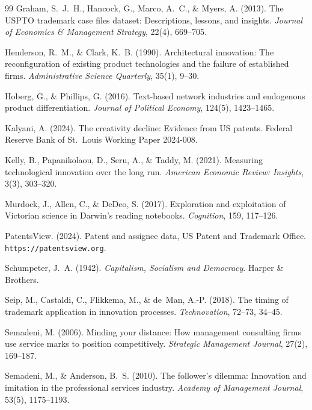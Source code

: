 \documentclass[11pt]{article}
\begin{document}
\begin{thebibliography}{99}
Graham, S.~J.~H., Hancock, G., Marco, A.~C., \& Myers, A. (2013). The USPTO
trademark case files dataset: Descriptions, lessons, and insights.
\emph{Journal of Economics \& Management Strategy}, 22(4), 669--705.

Henderson, R.~M., \& Clark, K.~B. (1990). Architectural innovation: The
reconfiguration of existing product technologies and the failure of
established firms. \emph{Administrative Science Quarterly}, 35(1), 9--30.

Hoberg, G., \& Phillips, G. (2016). Text-based network industries and
endogenous product differentiation. \emph{Journal of Political Economy},
124(5), 1423--1465.

Kalyani, A. (2024). The creativity decline: Evidence from US patents.
Federal Reserve Bank of St.\ Louis Working Paper 2024-008.

Kelly, B., Papanikolaou, D., Seru, A., \& Taddy, M. (2021). Measuring
technological innovation over the long run. \emph{American Economic
Review: Insights}, 3(3), 303--320.

Murdock, J., Allen, C., \& DeDeo, S. (2017). Exploration and exploitation
of Victorian science in Darwin's reading notebooks. \emph{Cognition},
159, 117--126.

PatentsView. (2024). Patent and assignee data, US Patent and Trademark
Office. \texttt{https://patentsview.org}.

Schumpeter, J.~A. (1942). \emph{Capitalism, Socialism and Democracy}.
Harper \& Brothers.

Seip, M., Castaldi, C., Flikkema, M., \& de~Man, A.-P. (2018). The timing
of trademark application in innovation processes. \emph{Technovation},
72--73, 34--45.

Semadeni, M. (2006). Minding your distance: How management consulting
firms use service marks to position competitively. \emph{Strategic
Management Journal}, 27(2), 169--187.

Semadeni, M., \& Anderson, B.~S. (2010). The follower's dilemma:
Innovation and imitation in the professional services industry.
\emph{Academy of Management Journal}, 53(5), 1175--1193.


\end{thebibliography}
\end{document}
